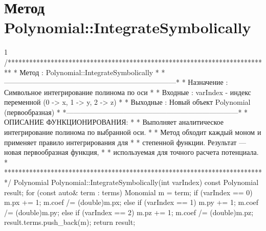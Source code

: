\pagebreak

\section{Метод Polynomial::IntegrateSymbolically}
\footnotesize
\begin{listing}{1}
/*************************************************************************
* Метод         : Polynomial::IntegrateSymbolically                      *
*------------------------------------------------------------------------*
* Назначение    : Символьное интегрирование полинома по оси              *
* Входные       : varIndex - индекс переменной (0 -> x, 1 -> y, 2 -> z)  *
* Выходные      : Новый объект Polynomial (первообразная)                *
*------------------------------------------------------------------------*
* ОПИСАНИЕ ФУНКЦИОНИРОВАНИЯ:                                             *
* Выполняет аналитическое интегрирование полинома по выбранной оси.      *
* Метод обходит каждый моном и применяет правило интегрирования для      *
* степенной функции. Результат — новая первообразная функция,            *
* используемая для точного расчета потенциала.                           *
*************************************************************************/
Polynomial Polynomial::IntegrateSymbolically(int varIndex) const {
    Polynomial result;
    for (const auto& term : terms) {
        Monomial m = term;
        if (varIndex == 0) { m.px += 1; m.coef /= (double)m.px; }
        else if (varIndex == 1) { m.py += 1; m.coef /= (double)m.py; }
        else if (varIndex == 2) { m.pz += 1; m.coef /= (double)m.pz; }
        result.terms.push_back(m);
    }
    return result;
}
\end{listing}
\normalsize

\pagebreak


